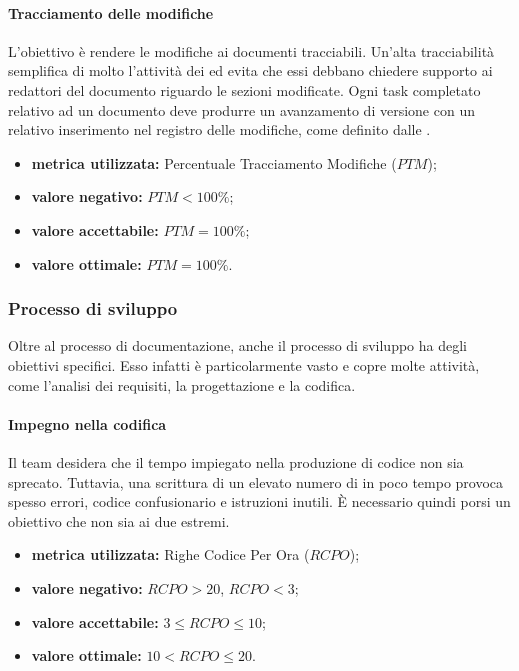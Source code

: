 			\paragraph{Tracciamento delle modifiche}
				\label{OTDM}
				L'obiettivo è rendere le modifiche ai documenti tracciabili. Un'alta tracciabilità semplifica di molto l'attività dei \verificatori{} ed evita che essi debbano chiedere supporto ai redattori del documento riguardo le sezioni modificate. Ogni task completato relativo ad un documento deve produrre un avanzamento di versione con un relativo inserimento nel registro delle modifiche, come definito dalle \ndpv.
				\begin{itemize}
					\item \textbf{metrica utilizzata:} Percentuale Tracciamento Modifiche ($PTM$);
					\item \textbf{valore negativo:} $PTM<100\%$;
					\item \textbf{valore accettabile:} $PTM=100\%$;
					\item \textbf{valore ottimale:} $PTM=100\%$.
				\end{itemize}
			
		\subsubsection{Processo di sviluppo}
			Oltre al processo di documentazione, anche il processo di sviluppo ha degli obiettivi specifici. Esso infatti è particolarmente vasto e copre molte attività, come l'analisi dei requisiti, la progettazione e la codifica.
			
			\paragraph{Impegno nella codifica}
				\label{OINC}
				Il team desidera che il tempo impiegato nella produzione di codice non sia sprecato. Tuttavia, una scrittura di un elevato numero di  in poco tempo provoca spesso errori, codice confusionario e istruzioni inutili. È necessario quindi porsi un obiettivo che non sia ai due estremi.
				\begin{itemize}
					\item \textbf{metrica utilizzata:} Righe Codice Per Ora ($RCPO$);
					\item \textbf{valore negativo:} $RCPO>20$, $RCPO<3$;
					\item \textbf{valore accettabile:} $ 3 \leq RCPO \leq 10$;
					\item \textbf{valore ottimale:} $10<RCPO\leq 20$.
				\end{itemize}
			
